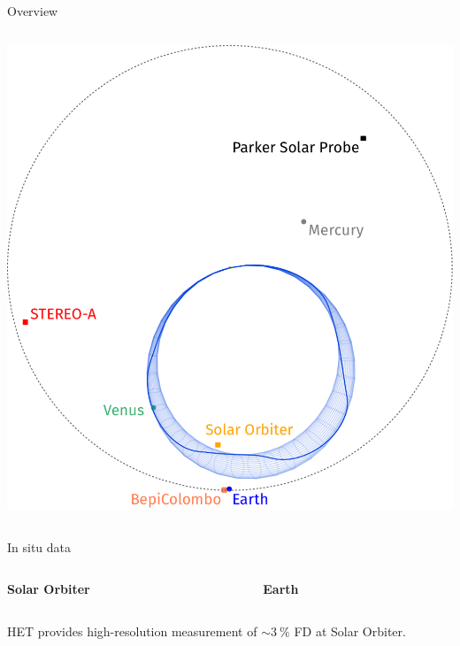 \documentclass[10pt,aspectratio=169,usenames,dvipsnames]{beamer}
\newcommand{\summary}{\textcolor{mOrange}{\faArrowCircleRight}\;}
\begin{document}
\begin{frame}{Overview}
\begin{columns}
\begin{column}{0.5\textwidth}
            \includegraphics[width=\textwidth]{plots/3dcore_visual_davies_new_panela.pdf}
        \end{column}
    \end{columns}
\end{frame}

\begin{frame}{In situ data}
    \vskip2mm
    \begin{columns}
        \begin{column}{0.5\textwidth}
            \centering
            \textbf{Solar Orbiter}\\
            \scalebox{0.5}{
                
            }
        \end{column}
        \begin{column}{0.5\textwidth}
            \centering
            \textbf{Earth}\\
            \scalebox{0.5}{
                
            }
        \end{column}
    \end{columns}
	\vskip-2mm
	\centering\summary HET provides high-resolution measurement of $\sim\SI{3}{\percent}$ FD at Solar Orbiter.
\end{frame}
\end{document}
